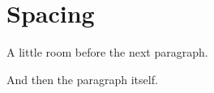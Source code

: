 \section{Spacing}

A little room before the next paragraph.
\vspace{12}

And then the paragraph itself.
